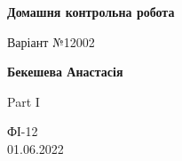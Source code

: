 \documentclass[a4paper,12pt, centered]{article}
\begin{document}
\begin{titlepage}
    \begin{center}
        \vspace*{1cm}
            
        \Huge
        \textbf{Домашня контрольна робота}
            
        \vspace{0.5cm}
        \LARGE
        Варіант №12002
            
        \vspace{1.5cm}
            
        \textbf{Бекешева Анастасія}
            
        \vfill
            
        Part I
            
        \vspace{0.8cm}
            

            
        \Large
        ФІ-12\\01.06.2022
            
    \end{center}
\end{titlepage}
\end{document}
